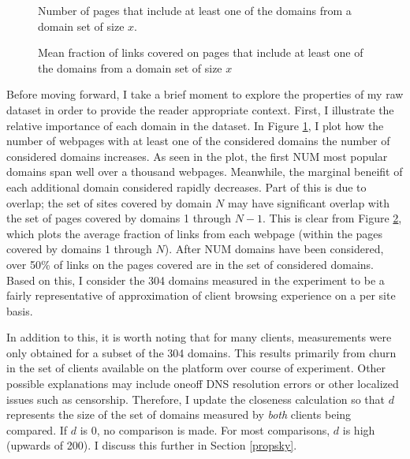 \begin{figure*}
    \center
            \begin{subfigure}[b]{.7\linewidth}
                \caption{Number of pages that include at least one of the domains from a domain set
                of size $x$.}
                \label{num_pages}
            \end{subfigure}
            \begin{subfigure}[b]{0.7\linewidth}
                \caption{Mean fraction of links covered on pages that include at least one of the
                domains from a domain set of size $x$}
                \label{frac_links}
            \end{subfigure}
\end{figure*}

Before moving forward, I take a brief moment to explore the properties of my raw dataset in order
to provide the reader appropriate context. First, I illustrate the relative importance of each
domain in the dataset. In Figure \ref{num_pages}, I plot how the number of webpages with at least
one of the
considered domains the number of considered domains increases. As seen in the plot, the first
NUM most popular domains span well over a thousand webpages. Meanwhile, the marginal beneifit of
each additional domain considered rapidly decreases. Part of this is due to overlap; the set of
sites covered by domain $N$ may have significant overlap with the set of pages covered by domains 1
through $N-1$. This is clear from Figure \ref{frac_links}, which plots the average fraction of links from each
webpage (within the pages covered by domains 1 through $N$). After NUM domains have been considered,
over 50\% of links on the pages covered are in the set of considered domains. Based on this, I
consider the 304 domains measured in the experiment to be a fairly representative of approximation
of client browsing experience on a per site basis. 

In addition to this, it is worth noting that for many clients, measurements were only obtained for
a subset of the 304 domains. This results primarily from churn in the set of clients available on
the platform over course of experiment. Other possible explanations may include oneoff DNS
resolution errors or other localized issues such as censorship. Therefore, I update the closeness
calculation so that $d$ represents the size of the set of domains measured by \emph{both} clients
being compared. If $d$ is 0, no comparison is made. For most comparisons, $d$ is high (upwards of
200). I discuss this further in Section \ref{propsky}.

